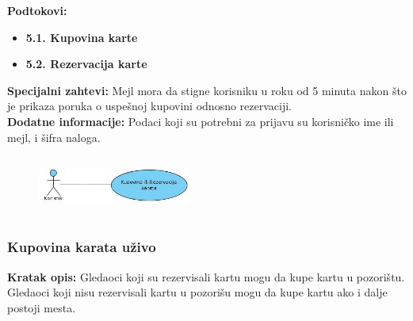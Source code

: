 \documentclass[a4paper]{article}
\begin{document}
\noindent\textbf{Podtokovi:}
  \begin{itemize}
    \item \textbf{5.1. Kupovina karte}
    \item \textbf{5.2. Rezervacija karte}
  \end{itemize}

\noindent\textbf{Specijalni zahtevi:} Mejl mora da stigne korisniku u roku od 5 minuta nakon što 
        je prikaza poruka o uspešnoj kupovini odnosno rezervaciji.\\

\noindent\textbf{Dodatne informacije:} Podaci koji su potrebni za prijavu su korisničko ime ili mejl, i 
        šifra naloga.

\begin{figure}[H]
  \begin{center}
      \includegraphics[width=50mm,height=20mm]{../diagrams/usecase_prodaja_karata.jpg}
  \end{center}
\end{figure}

\subsubsection{Kupovina karata uživo}
\noindent\textbf{Kratak opis:} Gledaoci koji su rezervisali kartu mogu da kupe kartu u pozorištu.
Gledaoci koji nisu rezervisali kartu u pozorišu mogu da kupe kartu ako i dalje postoji mesta.
\end{document}
